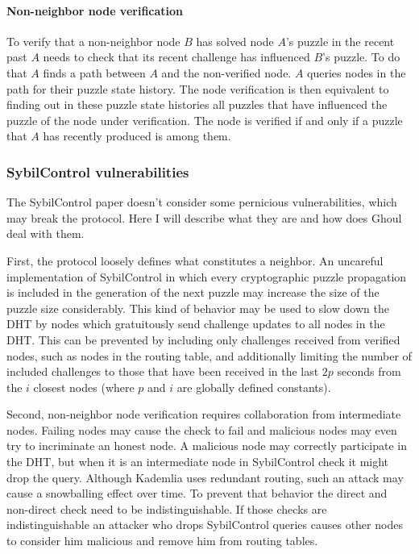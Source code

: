   \paragraph{Non-neighbor node verification}
  To verify that a non-neighbor node $B$ has solved node $A$'s puzzle in the
  recent past $A$ needs to check that its recent challenge has influenced $B$'s
  puzzle. 
  To do that $A$ finds a path between $A$ and the non-verified node.
  $A$ queries nodes in the path for their puzzle state history.
  The node verification is then equivalent to finding out in these puzzle state
  histories all puzzles that have influenced the puzzle of the node under
  verification.
  The node is verified if and only if a puzzle that $A$ has recently produced is
  among them.

\subsubsection{SybilControl vulnerabilities}
  The SybilControl paper doesn't consider some pernicious vulnerabilities, which
  may break the protocol.
  Here I will describe what they are and how does Ghoul
  deal with them.

  First, the protocol loosely defines what constitutes a neighbor. An
  uncareful implementation of SybilControl in which every cryptographic puzzle
  propagation is included in the generation of the next puzzle may increase the
  size of the puzzle size considerably. This kind of behavior may be used to
  slow down the DHT by nodes which gratuitously send challenge updates to all
  nodes in the DHT.
  This can be prevented by including only challenges received from verified
  nodes, such as nodes in the routing table, and additionally limiting the
  number of included challenges to those that have been received in the last
  $2p$ seconds from the $i$ closest nodes (where $p$ and $i$ are globally
  defined constants).

  Second, non-neighbor node verification requires collaboration from
  intermediate nodes.
  Failing nodes may cause the check to fail and malicious nodes may even try to
  incriminate an honest node. A malicious node may correctly participate in the
  DHT, but when it is an intermediate node in SybilControl check it might drop
  the query. Although Kademlia uses redundant routing, such an attack may cause
  a snowballing effect over time. To prevent that behavior the direct and
  non-direct check need to be indistinguishable.  If those checks are
  indistinguishable an attacker who drops SybilControl queries causes other
  nodes to consider him malicious and remove him from routing tables.

